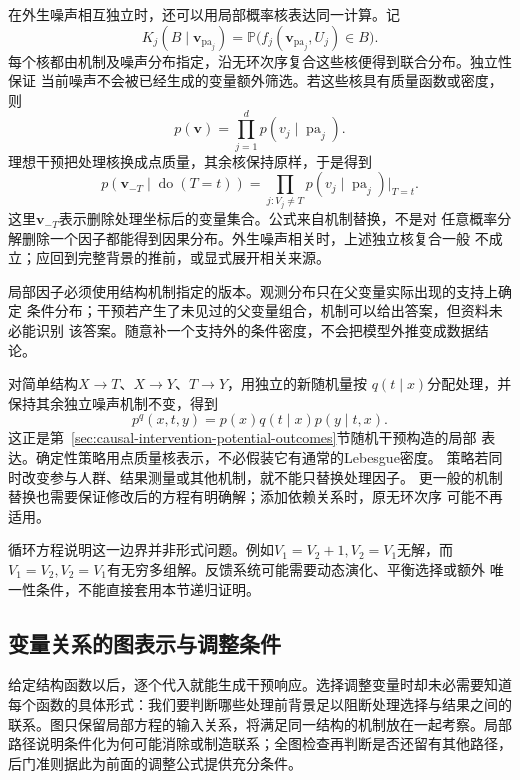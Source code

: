 在外生噪声相互独立时，还可以用局部概率核表达同一计算。记
\[
  K_j(B\mid\bm v_{\operatorname{pa}_j})
  =
  \mathbb P\bigl(f_j(\bm v_{\operatorname{pa}_j},U_j)\in B\bigr).
\]
每个核都由机制及噪声分布指定，沿无环次序复合这些核便得到联合分布。独立性保证
当前噪声不会被已经生成的变量额外筛选。若这些核具有质量函数或密度，则
\[
  p(\bm v)=\prod_{j=1}^d p(v_j\mid\operatorname{pa}_j).
\]
理想干预把处理核换成点质量，其余核保持原样，于是得到
\begin{equation}
  p(\bm v_{-T}\mid\operatorname{do}(T=t))
  =
  \prod_{j:V_j\ne T}
  p(v_j\mid\operatorname{pa}_j)\big|_{T=t}.
  \label{eq:causal-truncated-factorization}
\end{equation}
这里\(\bm v_{-T}\)表示删除处理坐标后的变量集合。公式来自机制替换，不是对
任意概率分解删除一个因子都能得到因果分布。外生噪声相关时，上述独立核复合一般
不成立；应回到完整背景的推前，或显式展开相关来源。

局部因子必须使用结构机制指定的版本。观测分布只在父变量实际出现的支持上确定
条件分布；干预若产生了未见过的父变量组合，机制可以给出答案，但资料未必能识别
该答案。随意补一个支持外的条件密度，不会把模型外推变成数据结论。

对简单结构\(X\to T\)、\(X\to Y\)、\(T\to Y\)，用独立的新随机量按
\(q(t\mid x)\)分配处理，并保持其余独立噪声机制不变，得到
\begin{equation}
  p^q(x,t,y)=p(x)q(t\mid x)p(y\mid t,x).
  \label{eq:causal-stochastic-intervention}
\end{equation}
这正是第~\ref{sec:causal-intervention-potential-outcomes}节随机干预构造的局部
表达。确定性策略用点质量核表示，不必假装它有通常的Lebesgue密度。
策略若同时改变参与人群、结果测量或其他机制，就不能只替换处理因子。
更一般的机制替换也需要保证修改后的方程有明确解；添加依赖关系时，原无环次序
可能不再适用。

循环方程说明这一边界并非形式问题。例如\(V_1=V_2+1,V_2=V_1\)无解，而
\(V_1=V_2,V_2=V_1\)有无穷多组解。反馈系统可能需要动态演化、平衡选择或额外
唯一性条件，不能直接套用本节递归证明。

\subsection{变量关系的图表示与调整条件}
\label{sec:causal-graph-adjustment}

给定结构函数以后，逐个代入就能生成干预响应。选择调整变量时却未必需要知道每个函数的具体形式：我们要判断哪些处理前背景足以阻断处理选择与结果之间的联系。图只保留局部方程的输入关系，将满足同一结构的机制放在一起考察。局部路径说明条件化为何可能消除或制造联系；全图检查再判断是否还留有其他路径，后门准则据此为前面的调整公式提供充分条件。

